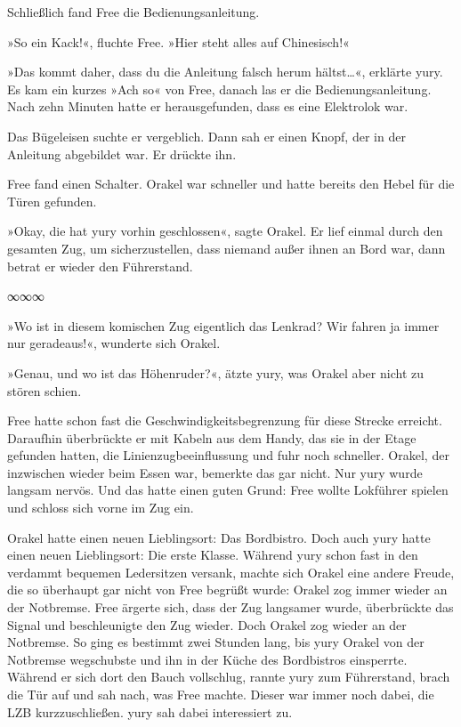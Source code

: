Schließlich fand Free die Bedienungsanleitung.

»So ein Kack!«, fluchte Free. »Hier steht alles auf Chinesisch!«

»Das kommt daher, dass du die Anleitung falsch herum hältst…«, erklärte yury. Es kam ein kurzes »Ach so« von Free, danach las er die Bedienungsanleitung. Nach zehn Minuten hatte er herausgefunden, dass es eine Elektrolok war.


Das Bügeleisen suchte er vergeblich. Dann sah er einen Knopf, der in der Anleitung abgebildet war. Er drückte ihn.


Free fand einen Schalter. Orakel war schneller und hatte bereits den Hebel für die Türen gefunden.


»Okay, die hat yury vorhin geschlossen«, sagte Orakel. Er lief einmal durch den gesamten Zug, um sicherzustellen, dass niemand außer ihnen an Bord war, dann betrat er wieder den Führerstand.

\begin{center}
    ∞∞∞
\end{center}

»Wo ist in diesem komischen Zug eigentlich das Lenkrad? Wir fahren ja immer nur geradeaus!«, wunderte sich Orakel.

»Genau, und wo ist das Höhenruder?«, ätzte yury, was Orakel aber nicht zu stören schien.

Free hatte schon fast die Geschwindigkeitsbegrenzung für diese Strecke erreicht. Daraufhin überbrückte er mit Kabeln aus dem Handy, das sie in der Etage gefunden hatten, die Linienzugbeeinflussung und fuhr noch schneller. Orakel, der inzwischen wieder beim Essen war, bemerkte das gar nicht. Nur yury wurde langsam nervös. Und das hatte einen guten Grund: Free wollte Lokführer spielen und schloss sich vorne im Zug ein.

Orakel hatte einen neuen Lieblingsort: Das Bordbistro. Doch auch yury hatte einen neuen Lieblingsort: Die erste Klasse. Während yury schon fast in den verdammt bequemen Ledersitzen versank, machte sich Orakel eine andere Freude, die so überhaupt gar nicht von Free begrüßt wurde: Orakel zog immer wieder an der Notbremse. Free ärgerte sich, dass der Zug langsamer wurde, überbrückte das Signal und beschleunigte den Zug wieder. Doch Orakel zog wieder an der Notbremse. So ging es bestimmt zwei Stunden lang, bis yury Orakel von der Notbremse wegschubste und ihn in der Küche des Bordbistros einsperrte. Während er sich dort den Bauch vollschlug, rannte yury zum Führerstand, brach die Tür auf und sah nach, was Free machte. Dieser war immer noch dabei, die LZB kurzzuschließen. yury sah dabei interessiert zu.

